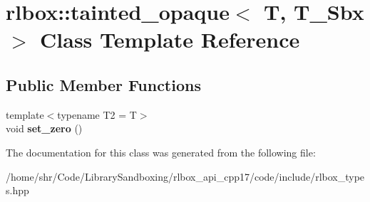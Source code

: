 \hypertarget{classrlbox_1_1tainted__opaque}{}\section{rlbox\+:\+:tainted\+\_\+opaque$<$ T, T\+\_\+\+Sbx $>$ Class Template Reference}
\label{classrlbox_1_1tainted__opaque}
\subsection*{Public Member Functions}
\begin{DoxyCompactItemize}
\item 
\mbox{\label{classrlbox_1_1tainted__opaque_a04c0acc924d20dbef92b2c348fc799e8}} 
{\footnotesize template$<$typename T2  = T$>$ }\\void {\bfseries set\+\_\+zero} ()
\end{DoxyCompactItemize}


The documentation for this class was generated from the following file\+:\begin{DoxyCompactItemize}
\item 
/home/shr/\+Code/\+Library\+Sandboxing/rlbox\+\_\+api\+\_\+cpp17/code/include/rlbox\+\_\+types.\+hpp\end{DoxyCompactItemize}
